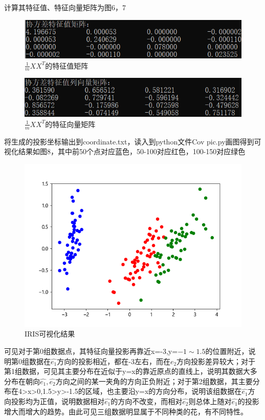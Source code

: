 \documentclass{article}
\begin{document}
计算其特征值、特征向量矩阵为图6，7	
\begin{figure}[!h]
	
	\centering
	\includegraphics[scale=1]{cov_EV}
	\caption{\heiti{}$ \frac{1}{m}XX^T $的特征值矩阵}
	
\end{figure}
\begin{figure}[!h]
	
	\centering
	\includegraphics[scale=1]{vec}
	\caption{\heiti{}$ \frac{1}{m}XX^T $的特征向量矩阵}
	
\end{figure}


将生成的投影坐标输出到coordinate.txt，读入到python文件Cov pic.py画图得到可视化结果如图8，其中前50个点对应蓝色，50-100对应红色，100-150对应绿色
	\begin{figure}[!h]
	
	\centering
	\includegraphics[scale=1]{iris}
	\caption{\heiti{}IRIS可视化结果}
	
\end{figure}


可见对于第0组数据点，其特征向量投影再靠近x=-3,y=$ -1\sim 1.5 $的位置附近，说明第0组数据在$ \hat{e_1} $方向的投影相近，都在-3左右，而在$ \hat{e_2} $方向投影差异较大；对于第1组数据，可见其主要分布在近似于y=x的靠近原点的直线上，说明其数据大多分布在朝向$ \hat{e_1},\hat{e_2} $方向之间的某一夹角的方向正负附近；对于第2组数据，其主要分布在4>x>0,1.5>y>-1.5的区域，也主要沿y=x的方向分布，说明该组数据在$ \hat{e_1} $方向投影均为正值，说明数据相对$ \hat{e_1} $的方向不改变，而相对$ \hat{e_2} $则总体上随对$ \hat{e_1} $的投影增大而增大的趋势。由此可见三组数据明显属于不同种类的花，有不同特性。
\end{document}

